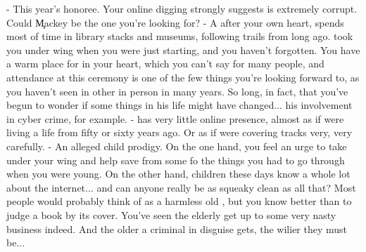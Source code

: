 \documentclass[char]{guildcamp4}
\begin{document}
\begin{contacts}
	\contact{\cMackey{}} - This year's honoree. Your online digging strongly suggests \cMackey{\they} is extremely corrupt. Could \c{Mackey{}}  be the one you're looking for?
	\contact{\cHistorian{}} - A  after your own heart, \cHistorian{} spends most of  time in library stacks and museums, following trails from long ago.  took you under  wing when you were just starting, and you haven't forgotten. You have a warm place for  in your heart, which you can't say for many people, and  attendance at this ceremony is one of the few things you're looking forward to, as you haven't seen in other in person in many years. So long, in fact, that you've begun to wonder if some things in his life might have changed... his involvement in cyber crime, for example.
	\contact{\cMarlowe{}} -  has very little online presence, almost as if  were living a life from fifty or sixty years ago. Or as if  were covering  tracks very, very carefully.
	\contact{\cEncyclopedia{}} - An alleged child prodigy. On the one hand, you feel an urge to take  under your wing and help save  from some fo the things you had to go through when you were young. On the other hand, children these days know a whole lot about the internet... and can anyone really be as squeaky clean as all that?
	\contact{\cTeaLady{}} Most people would probably think of  as a harmless old , but you know better than to judge a book by its cover. You've seen the elderly get up to some very nasty business indeed. And the older a criminal in disguise gets, the wilier they must be...
\end{contacts}

\end{document}
